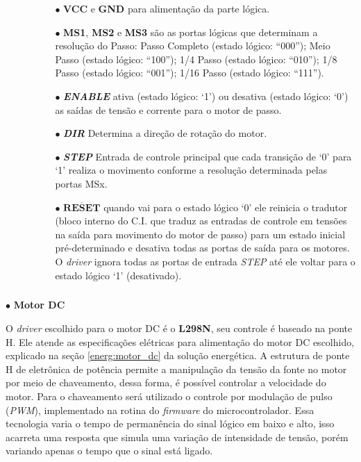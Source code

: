     \begin{itemize}
        \item[ ]
        \begin{itemize}
            \item[ ]
            \begin{itemize}
                \item[$\bullet$] \textbf{VCC} e \textbf{GND} para alimentação da parte lógica.
                \item[$\bullet$] \textbf{MS1}, \textbf{MS2} e \textbf{MS3} são as portas lógicas que determinam a resolução do Passo: Passo Completo (estado lógico: ``000''); Meio Passo (estado lógico: ``100''); 1/4 Passo (estado lógico: ``010''); 1/8 Passo (estado lógico: ``001'');  1/16 Passo (estado lógico: ``111'').
                \item[$\bullet$] \textbf{\textit{ENABLE}} ativa (estado lógico: `1') ou desativa (estado lógico: `0') as saídas de tensão  e corrente para o motor de passo.
                \item[$\bullet$] \textbf{\textit{DIR}} Determina a direção de rotação do motor.
                \item[$\bullet$] \textbf{\textit{STEP}} Entrada de controle principal que cada transição de `0' para `1' realiza o movimento conforme a resolução determinada pelas portas MSx.
                \item[$\bullet$] \textbf{$\overline{\textbf{RESET}}$} quando vai para o estado lógico `0' ele reinicia o tradutor (bloco interno do C.I. que traduz as entradas de controle em tensões na saída para movimento do motor de passo) para um estado inicial pré-determinado e desativa todas as portas de saída para os motores. O \textit{driver} ignora todas as portas de entrada \textit{STEP} até ele voltar para o estado lógico `1' (desativado).
            \end{itemize}
        \end{itemize}
    \end{itemize}
    
    \newpage
    \subparagraph*{} $\bullet$ \textbf{Motor DC}
    
    O \textit{driver} escolhido para o motor DC é o \textbf{L298N}, seu controle é baseado na ponte H. Ele atende as especificações elétricas para alimentação do motor DC escolhido, explicado na seção \ref{energ:motor_dc} da solução energética. A estrutura de ponte H de eletrônica de potência permite a manipulação da tensão da fonte no motor por meio de chaveamento, dessa forma, é possível controlar a velocidade do motor. Para o chaveamento será utilizado o controle por modulação de pulso (\textit{PWM}), implementado na rotina do \textit{firmware} do microcontrolador. Essa tecnologia varia o tempo de permanência do sinal lógico em baixo e alto, isso acarreta uma resposta que simula uma variação de intensidade de tensão, porém variando apenas o tempo que o sinal está ligado.  
    
